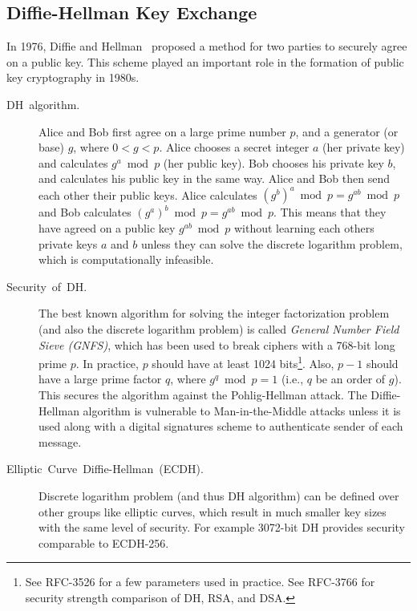 \documentclass[11pt]{article}
\theoremstyle{plain}
\begin{document}
\subsection{Diffie-Hellman Key Exchange}
\label{sec:diffie-hellman} In 1976, Diffie and Hellman~\cite{Diffie:2006:NDC:2263321.2269104}
proposed a method for two parties to securely agree on a public key.
This scheme played an important role in the formation of public key
cryptography in 1980s.
\begin{description}
	\item [{DH~algorithm.}] Alice and Bob first agree on a large prime number
	$p$, and a generator (or base) $g$, where $0<g<p$. Alice chooses
	a secret integer $a$ (her private key) and calculates $g^{a}\bmod p$
	(her public key). Bob chooses his private key $b$, and calculates
	his public key in the same way. Alice and Bob then send each other
	their public keys. Alice calculates $(g^{b})^{a}\bmod p=g^{ab}\bmod p$
	and Bob calculates $(g^{a})^{b}\bmod p=g^{ab}\bmod p$. This means
	that they have agreed on a public key $g^{ab}\bmod p$ without learning
	each others private keys $a$ and $b$ unless they can solve the discrete
	logarithm problem, which is computationally infeasible.
	\item [{Security~of~DH.}] The best known algorithm for solving the integer
	factorization problem (and also the discrete logarithm problem) is
	called \emph{General Number Field Sieve (GNFS)}, which has been used
	to break ciphers with a 768-bit long prime $p$. In practice, $p$
	should have at least 1024 bits\footnote{See RFC-3526 for a few parameters used in practice. See RFC-3766 for
		security strength comparison of DH, RSA, and DSA.}. Also, $p-1$ should have a large prime factor $q$, where $g^{q}\bmod p=1$
	(i.e., $q$ be an order of $g$). This secures the algorithm against
	the Pohlig-Hellman attack. The Diffie-Hellman algorithm is vulnerable
	to Man-in-the-Middle attacks unless it is used along with a digital
	signatures scheme to authenticate sender of each message.
	\item [{Elliptic~Curve~Diffie-Hellman~(ECDH).}] Discrete logarithm problem
	(and thus DH algorithm) can be defined over other groups like elliptic
	curves, which result in much smaller key sizes with the same level
	of security. For example 3072-bit DH provides security comparable
	to ECDH-256.
\end{description}
\end{document}
